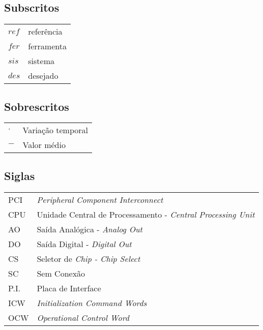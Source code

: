 \subsection*{Subscritos}

\begin{tabular}{p{}p{}}
$ref$  & referência \tabularnewline
$fer$  & ferramenta \tabularnewline
$sis$  & sistema \tabularnewline
$des$ & desejado\tabularnewline
\end{tabular}


\subsection*{Sobrescritos}

\begin{tabular}{p{}p{}}
$\cdot$  & Variação temporal \tabularnewline
$-$  & Valor médio \tabularnewline
\end{tabular}


\subsection*{Siglas}

\begin{tabular}{p{}p{}}
PCI  & \textit{Peripheral Component Interconnect}\tabularnewline
CPU & Unidade Central de Processamento - \textit{Central Processing Unit} \tabularnewline
AO & Saída Analógica - \textit{Analog Out}\tabularnewline
DO & Saída Digital - \textit{Digital Out}\tabularnewline
CS & Seletor de \textit{Chip - Chip Select}\tabularnewline
SC & Sem Conexão\tabularnewline
P.I. & Placa de Interface\tabularnewline
ICW & \textit{Initialization Command Words}\tabularnewline
OCW & \textit{Operational Control Word}\tabularnewline
\end{tabular}
